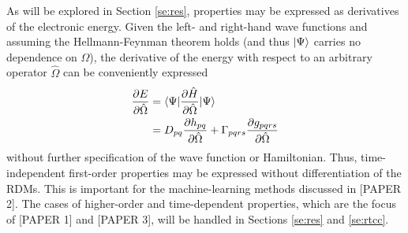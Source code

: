 As will be explored in Section \ref{se:res}, properties may be expressed as derivatives of the electronic energy. Given the left- and right-hand wave functions and assuming the Hellmann-Feynman theorem holds (and thus $| \Psi \rangle$ carries no dependence on $\Omega$), the derivative of the energy with respect to an arbitrary operator $\hat\Omega$ can be conveniently expressed
\begin{equation} \label{eq:dE}
    \begin{aligned}
    \frac{\partial E}{\partial \hat\Omega} &= \langle\Psi |\frac{\partial \hat{H}}{\partial \hat\Omega}| \Psi \rangle\\
                                  &= D_{pq}\frac{\partial h_{pq}}{\partial \hat\Omega} + \Gamma_{pqrs}\frac{\partial g_{pqrs}}{\partial \hat\Omega}
    \end{aligned}
\end{equation}
without further specification of the wave function or Hamiltonian. Thus, time-independent first-order properties may be expressed without differentiation of the RDMs. This is important for the machine-learning 
methods discussed in [PAPER 2]. The cases of higher-order and time-dependent properties, which are the
focus of [PAPER 1] and [PAPER 3], will be handled in Sections \ref{se:res} and \ref{se:rtcc}. 
